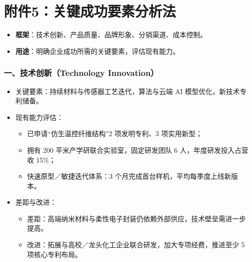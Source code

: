 \documentclass[UTF8]{report}
\theoremstyle{MyLineTheoremStyle} %
\theoremstyle{MyBlockTheoremStyle} %
\theoremstyle{MySubsubsectionStyle} %
\begin{document}
\section{附件5：关键成功要素分析法}
\begin{itemize}
    \item \textbf{框架}：技术创新、产品质量、品牌形象、分销渠道、成本控制。
    \item \textbf{用途}：明确企业成功所需的关键要素，评估现有能力。
\end{itemize}

  \subsubsection{一、技术创新（Technology Innovation）}
    \begin{itemize}
      \item 关键要素：持续材料与传感器工艺迭代，算法与云端 AI 模型优化，新技术专利储备。  
      \item 现有能力评估：
        \begin{itemize}
          \item 已申请“仿生温控纤维结构”2 项发明专利、3 项实用新型；  
          \item 拥有 200 平米产学研联合实验室，固定研发团队 6 人，年度研发投入占营收 15\%；  
          \item 快速原型／敏捷迭代体系：3 个月完成首台样机，平均每季度上线新版本。
        \end{itemize}
      \item 差距与改进：
        \begin{itemize}
          \item 差距：高端纳米材料与柔性电子封装仍依赖外部供应，技术壁垒需进一步提高。  
          \item 改进：拓展与高校／龙头化工企业联合研发，加大专项经费，推进至少 5 项核心专利布局。
        \end{itemize}
    \end{itemize}
\end{document}
